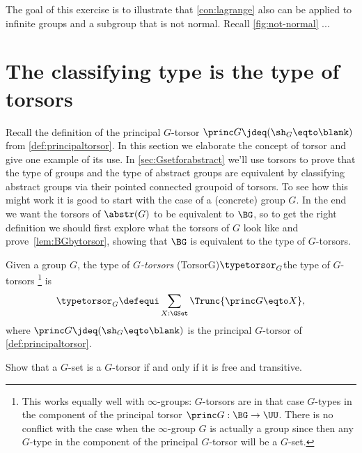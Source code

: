 \begin{xca}\label{xca:lagrange-if-subgr-not-normal}
The goal of this exercise is to illustrate that \cref{con:lagrange}
also can be applied to infinite groups and a subgroup that is not normal.
Recall \cref{fig:not-normal} ...
\end{xca}






\section{The classifying type is the type of torsors}
\label{sec:torsors}
Recall the definition of the principal $G$-torsor 
$\princ G \jdeq (\sh_G \eqto \blank)$ from \cref{def:principaltorsor}.
In this section we elaborate the concept of torsor and give one example
of its use.
In \cref{sec:Gsetforabstract} we'll use torsors to prove that the type of groups and the type of abstract groups are equivalent by classifying abstract groups via their pointed connected groupoid of torsors.  To see how this might work it is good to start with the case of a (concrete) group $G$.
In the end we want the torsors of $\abstr(G)$ to be equivalent to $\BG$, so to get the right definition we should first explore what the torsors of $G$ look like and prove~\cref{lem:BGbytorsor}, showing that $\BG$ is equivalent to the type of $G$-torsors.
\begin{definition}\label{def:Gtorsor}
  Given a group $G$, the type of \emph{$G$-torsors}%
  \glossary(TorsorG){$\protect\typetorsor_G$}{the type of $G$-torsors}%
  \footnote{This works equally well with $\infty$-groups: $G$-torsors are in that case $G$-types in the component of the principal torsor $\princ G:\BG\to\UU$. There is no conflict with the case when the $\infty$-group $G$ is actually a group since then any $G$-type in the component of the principal $G$-torsor will be a $G$-set.}
  is
  \[
    \typetorsor_G\defequi\sum_{X:\GSet}\Trunc{\princ G \eqto X},
  \]
  where $\princ G \jdeq (\sh_G \eqto \blank)$ is the 
  principal $G$-torsor of \cref{def:principaltorsor}.
\end{definition}

\begin{xca}\label{xca:torsor=free+transitive}
  Show that a $G$-set is a $G$-torsor if and only if it is free and transitive.
\end{xca}

